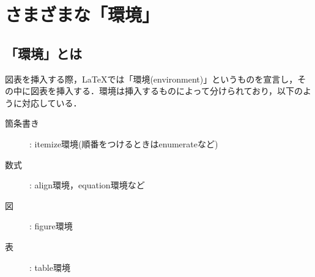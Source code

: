 \section{さまざまな「環境」}
\subsection{「環境」とは}
図表を挿入する際，\LaTeX では「環境(environment)」というものを宣言し，その中に図表を挿入する．環境は挿入するものによって分けられており，以下のように対応している．
\begin{description}
  \item[箇条書き]: itemize環境(順番をつけるときはenumerateなど)
  \item[数式]: align環境，equation環境など
  \item[図]: figure環境
  \item[表]: table環境
\end{description}